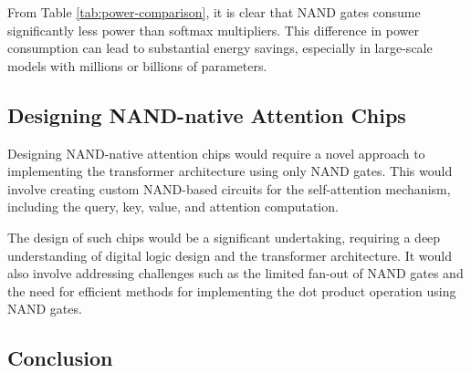 From Table \ref{tab:power-comparison}, it is clear that NAND gates consume significantly less power than softmax multipliers. This difference in power consumption can lead to substantial energy savings, especially in large-scale models with millions or billions of parameters.













\subsection{Designing NAND-native Attention Chips}













Designing NAND-native attention chips would require a novel approach to implementing the transformer architecture using only NAND gates. This would involve creating custom NAND-based circuits for the self-attention mechanism, including the query, key, value, and attention computation.













The design of such chips would be a significant undertaking, requiring a deep understanding of digital logic design and the transformer architecture. It would also involve addressing challenges such as the limited fan-out of NAND gates and the need for efficient methods for implementing the dot product operation using NAND gates.













\subsection{Conclusion}













